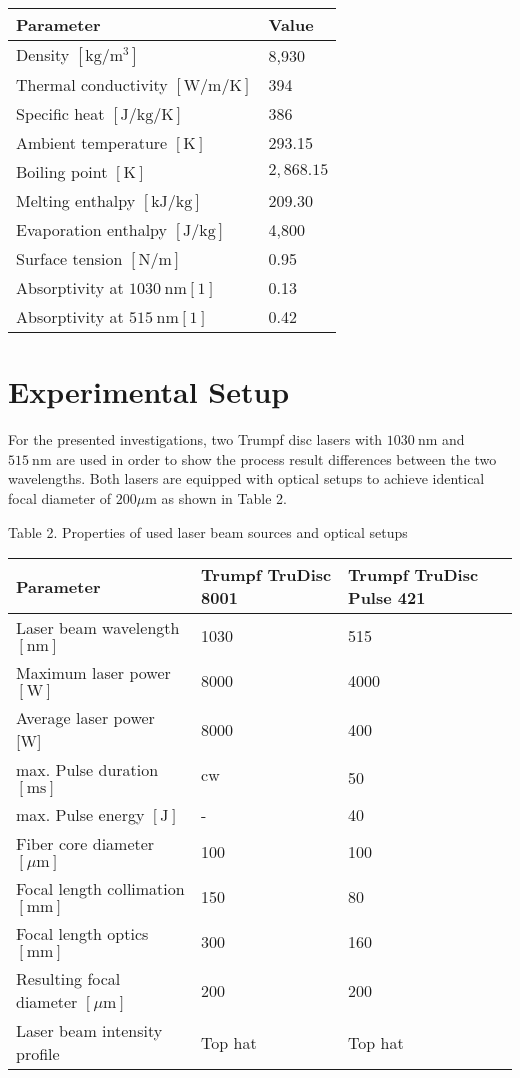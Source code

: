 \documentclass[10pt]{article}
\begin{document}
\begin{center}
\begin{tabular}{l|l}
\hline
Parameter & Value \\
\hline
Density $\left[\mathrm{kg} / \mathrm{m}^{3}\right]$ & 8,930 \\
\hline
Thermal conductivity $[\mathrm{W} / \mathrm{m} / \mathrm{K}]$ & 394 \\
\hline
Specific heat $[\mathrm{J} / \mathrm{kg} / \mathrm{K}]$ & 386 \\
\hline
Ambient temperature $[\mathrm{K}]$ & 293.15 \\
\hline
Boiling point $[\mathrm{K}]$ & $2,868.15$ \\
\hline
Melting enthalpy $[\mathrm{kJ} / \mathrm{kg}]$ & 209.30 \\
\hline
Evaporation enthalpy $[\mathrm{J} / \mathrm{kg}]$ & 4,800 \\
\hline
Surface tension $[\mathrm{N} / \mathrm{m}]$ & 0.95 \\
\hline
Absorptivity at $1030 \mathrm{~nm}[1]$ & 0.13 \\
\hline
Absorptivity at $515 \mathrm{~nm}[1]$ & 0.42 \\
\hline
\end{tabular}
\end{center}

\section*{Experimental Setup}
For the presented investigations, two Trumpf disc lasers with $1030 \mathrm{~nm}$ and $515 \mathrm{~nm}$ are used in order to show the process result differences between the two wavelengths. Both lasers are equipped with optical setups to achieve identical focal diameter of $200 \mu \mathrm{m}$ as shown in Table 2.

Table 2. Properties of used laser beam sources and optical setups

\begin{center}
\begin{tabular}{l|l|l}
\hline
Parameter & Trumpf TruDisc 8001 & Trumpf TruDisc Pulse 421 \\
\hline
Laser beam wavelength $[\mathrm{nm}]$ & 1030 & 515 \\
\hline
Maximum laser power $[\mathrm{W}]$ & 8000 & 4000 \\
\hline
Average laser power [W] & 8000 & 400 \\
\hline
max. Pulse duration $[\mathrm{ms}]$ & $\mathrm{cw}$ & 50 \\
\hline
max. Pulse energy $[\mathrm{J}]$ & - & 40 \\
\hline
Fiber core diameter $[\mu \mathrm{m}]$ & 100 & 100 \\
\hline
Focal length collimation $[\mathrm{mm}]$ & 150 & 80 \\
\hline
Focal length optics $[\mathrm{mm}]$ & 300 & 160 \\
\hline
Resulting focal diameter $[\mu \mathrm{m}]$ & 200 & 200 \\
\hline
Laser beam intensity profile & Top hat & Top hat \\
\hline
\end{tabular}
\end{center}
\end{document}
